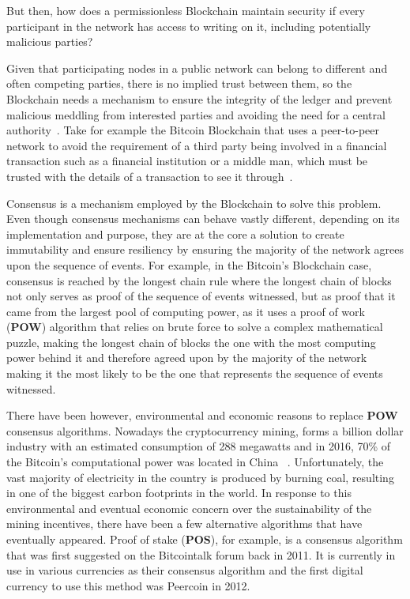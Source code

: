 But then, how does a permissionless Blockchain maintain security if every
participant in the network has access to writing on it, including potentially
malicious parties?

Given that participating nodes in a public network can belong to different and
often competing parties, there is no implied trust between them, so the
Blockchain needs a mechanism to ensure the integrity of the ledger and prevent
malicious meddling from interested parties and avoiding the need for a central
authority~\cite{Barclay2017}.  Take for example the Bitcoin Blockchain that
uses a peer-to-peer network to avoid the requirement of a third party being
involved in a financial transaction such as a financial institution or a middle
man, which must be trusted with the details of a transaction to see it
through~\cite{Nakamoto2008}.

Consensus is a mechanism employed by the Blockchain to solve this problem.
Even though consensus mechanisms can behave vastly different, depending on its
implementation and purpose, they are at the core a solution to create
immutability and ensure resiliency by ensuring the majority of the network
agrees upon the sequence of events.  For example, in the Bitcoin's Blockchain
case, consensus is reached by the longest chain rule where the longest chain of
blocks not only serves as proof of the sequence of events witnessed, but as
proof that it came from the largest pool of computing power, as it uses a proof
of work (\textbf{POW}) algorithm that relies on brute force to solve a complex
mathematical puzzle, making the longest chain of blocks the one with the most
computing power behind it and therefore agreed upon by the majority of the
network~\cite{Baars2016,Wood2017} making it the most likely to be the one that
represents the sequence of events witnessed.

There have been however, environmental and economic reasons to replace
\textbf{POW} consensus algorithms. Nowadays the cryptocurrency mining, forms a
billion dollar industry with an estimated consumption of 288 megawatts and in
2016, 70\% of the Bitcoin's computational power was located in China
~\cite{BitcoinMining2017}.  Unfortunately, the vast majority of electricity in
the country is produced by burning coal, resulting in one of the biggest carbon
footprints in the world. In response to this environmental and eventual
economic concern over the sustainability of the mining incentives, there have
been a few alternative algorithms that have eventually appeared. Proof of stake
(\textbf{POS}), for example, is a consensus algorithm that was first suggested
on the Bitcointalk forum back in 2011. It is currently in use in various
currencies as their consensus algorithm and the first digital currency to use
this method was Peercoin in 2012. 

